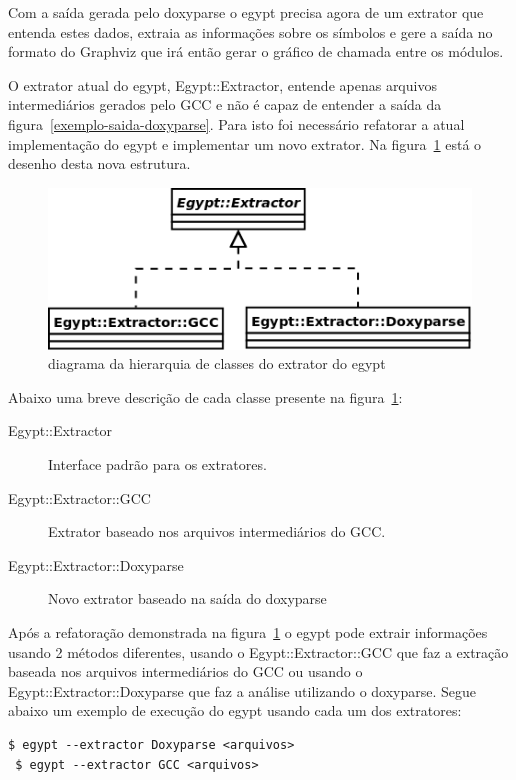 Com a saída gerada pelo doxyparse o egypt precisa agora de um extrator que
entenda estes dados, extraia as informações sobre os símbolos e gere a saída no
formato do Graphviz que irá então gerar o gráfico de chamada entre os módulos.

O extrator atual do egypt, Egypt::Extractor, entende apenas arquivos
intermediários gerados pelo GCC e não é capaz de entender a saída da
figura~\ref{exemplo-saida-doxyparse}. Para isto foi necessário refatorar a
atual implementação do egypt e implementar um novo extrator. Na
figura~\ref{egypt-diagram-extractor} está o desenho desta nova estrutura.

\begin{figure}[h]
\center
\includegraphics[scale=0.5]{imagens/egypt-diagram-extractor}
\caption{diagrama da hierarquia de classes do extrator do egypt}
\label{egypt-diagram-extractor}
\end{figure}

Abaixo uma breve descrição de cada classe presente na
figura~\ref{egypt-diagram-extractor}:

\begin{description}
\item[Egypt::Extractor] Interface padrão para os extratores.
\item[Egypt::Extractor::GCC] Extrator baseado nos arquivos intermediários do GCC.
\item[Egypt::Extractor::Doxyparse] Novo extrator baseado na saída do doxyparse
\end{description}

Após a refatoração demonstrada na figura~\ref{egypt-diagram-extractor} o egypt
pode extrair informações usando 2 métodos diferentes, usando o
Egypt::Extractor::GCC que faz a extração baseada nos arquivos intermediários do
GCC ou usando o Egypt::Extractor::Doxyparse que faz a análise utilizando o
doxyparse. Segue abaixo um exemplo de execução do egypt usando cada um dos
extratores:

\begin{Verbatim}[frame=single,fontsize=\relsize{-2},fontfamily=courier]
 $ egypt --extractor Doxyparse <arquivos>
 $ egypt --extractor GCC <arquivos>
\end{Verbatim}

